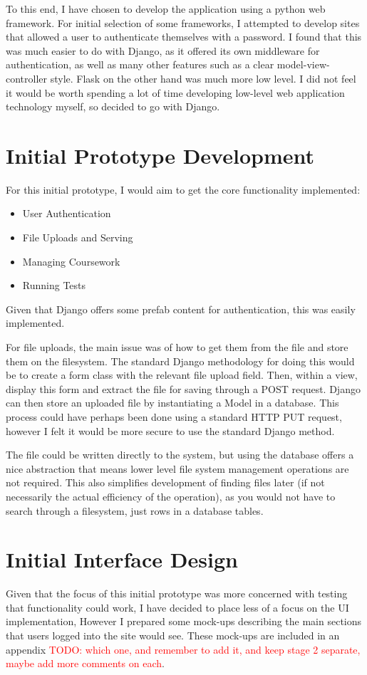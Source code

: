 \documentclass[a4paper,11pt]{report}
\newcommand{\todo}[1]{\textcolor{red}{TODO: #1}}
\begin{document}
To this end, I have chosen to develop the application using a python web framework. For initial selection of some frameworks, I attempted to develop sites that allowed a user to authenticate themselves with a password. I found that this was much easier to do with Django, as it offered its own middleware for authentication, as well as many other features such as a clear model-view-controller style. Flask on the other hand was much more low level. I did not feel it would be worth spending a lot of time developing low-level web application technology myself, so decided to go with Django.\par
\section{Initial Prototype Development}
For this initial prototype, I would aim to get the core functionality implemented:
\begin{itemize}
\item User Authentication
\item File Uploads and Serving
\item Managing Coursework
\item Running Tests
\end{itemize}
Given that Django offers some prefab content for authentication, this was easily implemented.\par
For file uploads, the main issue was of how to get them from the file and store them on the filesystem. The standard Django methodology for doing this would be to create a form class with the relevant file upload field. Then, within a view, display this form and extract the file for saving through a POST request. Django can then store an uploaded file by instantiating a Model in a database. This process could have perhaps been done using a standard HTTP PUT request, however I felt it would be more secure to use the standard Django method.\par
The file could be written directly to the system, but using the database offers a nice abstraction that means lower level file system management operations are not required. This also simplifies development of finding files later (if not necessarily the actual efficiency of the operation), as you would not have to search through a filesystem, just rows in a database tables.\par

\section{Initial Interface Design}
\doublespacing
Given that the focus of this initial prototype was more concerned with testing that functionality could work, I have decided to place less of a focus on the UI implementation, However I prepared some mock-ups describing the main sections that users logged into the site would see. These mock-ups are included in an appendix \todo{which one, and remember to add it, and keep stage 2 separate, maybe add more comments on each}.
\end{document}
